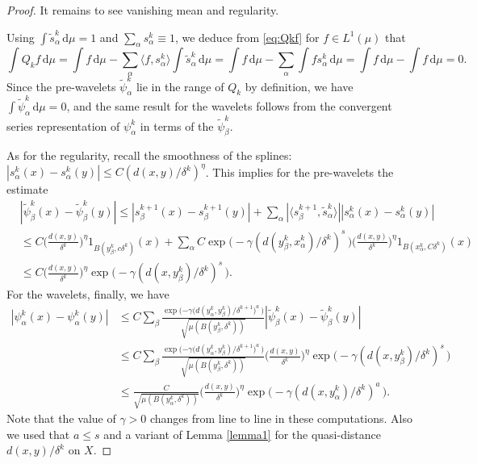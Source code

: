 \documentclass{amsart}
\numberwithin{equation}{section}
\theoremstyle{plain}
\theoremstyle{definition}
\theoremstyle{remark}
\begin{document}
{{{  
\begin{proof} It remains to see vanishing mean and  regularity.

Using $\int\tilde{s}^k_\alpha{\,\mathrm{d}}\mu =1$ and $\sum_\alpha s^k_\alpha\equiv 1$, we deduce from \eqref{eq:Qkf} for $f\in L^1(\mu)$ that
\begin{equation*}
  \int Q_k f{\,\mathrm{d}}\mu=\int f{\,\mathrm{d}}\mu-\sum_\alpha\langle f,s^k_\alpha\rangle \int\tilde{s}^k_\alpha{\,\mathrm{d}}\mu
  =\int f{\,\mathrm{d}}\mu-\sum_\alpha\int f s^k_\alpha{\,\mathrm{d}}\mu
  =\int f{\,\mathrm{d}}\mu-\int f{\,\mathrm{d}}\mu=0.
\end{equation*}
Since the pre-wavelets $\tilde\psi^k_\alpha$ lie in the range of $Q_k$ by definition, we have $\int\tilde\psi^k_\alpha{\,\mathrm{d}}\mu=0$, and the same result for the wavelets follows from the convergent series representation of $\psi^k_\alpha$ in terms of the $\tilde\psi^k_\beta$.
   
 As for the regularity, recall the smoothness of the splines: ${|{s^k_{\alpha}(x)-s^k_{\alpha}(y)}|}\leq C(d(x,y)/\delta^k)^{\eta}$. This implies for the pre-wavelets the estimate \begin{equation*}
\begin{split}
  &{|{\tilde\psi^k_{\beta}(x)-\tilde\psi^k_\beta(y)}|}
  \leq{|{s^{k+1}_{\beta}(x)-s^{k+1}_{\beta}(y)}|}
  +\sum_{\alpha}{|{{\langle {s^{k+1}_{\beta}},{\tilde{s}^k_{\alpha}} \rangle}}|}{|{s^k_{\alpha}(x)-s^k_{\alpha}(y)}|} \\
  &\leq C\Big(\frac{d(x,y)}{\delta^k}\Big)^{\eta}1_{B(y^k_{\beta},c\delta^k)}(x)
  +\sum_{\alpha}C \exp\big (-\gamma ( d(y^k_\beta,x^k_\alpha)/\delta^k)^s\, \big)\Big(\frac{d(x,y)}{\delta^k}\Big)^{\eta}1_{B(x^k_{\alpha},C\delta^k)}(x) \\
  &\leq C\Big(\frac{d(x,y)}{\delta^k}\Big)^{\eta}\exp\big(-\gamma (d(x,y^{k}_\beta)/\delta^k)^s\, \big).
\end{split}
\end{equation*}
For the wavelets, finally, we have
\begin{equation*}
\begin{split}
  {|{\psi^k_{\alpha}(x)-\psi^k_\alpha(y)}|}
  &\leq C\sum_\beta\frac{\exp\big({-\gamma (d(y^{k}_{\alpha},y^{k}_{\beta})/\delta^{k+1}})^a\, \big)}{\sqrt{ \mu(B(y^k_{\beta},\delta ^k))}}{|{\tilde\psi^k_{\beta}(x)-\tilde\psi^k_\beta(y)}|} \\
 &\leq C\sum_\beta\frac{\exp\big({-\gamma (d(y^{k}_{\alpha},y^{k}_{\beta})/\delta^{k+1}})^a\, \big)}{\sqrt{ \mu(B(y^k_{\beta},\delta ^k))}}
 \Big(\frac{d(x,y)}{\delta^k}\Big)^{\eta}\exp\big(-\gamma (d(x,y^{k}_\beta)/\delta^k)^s\, \big) \\
 &\leq \frac{C}{\sqrt{ \mu(B(y^k_{\alpha},\delta ^k))}}\Big(\frac{d(x,y)}{\delta^k}\Big)^{\eta}\exp\big(-\gamma (d(x,y^{k}_\alpha)/\delta^k)^a\, \big).
\end{split}
\end{equation*}
Note that the value of $\gamma>0$ changes from line to line in these computations. Also we used that $a\le s$  and a variant of Lemma \ref{lemma1} for the quasi-distance $d(x,y)/\delta^k$ on $X$.
\end{proof}

}}}
\end{document}
